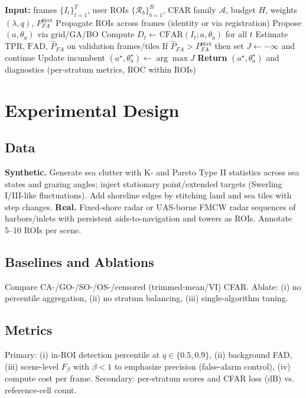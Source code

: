 \documentclass[conf]{new-aiaa}
\begin{document}
\begin{algorithm}[t]
\caption{User-in-the-Loop CFAR Tuning (High Level)}
\label{alg:cfar}
\begin{algorithmic}[1]
\STATE \textbf{Input:} frames $\{I_t\}_{t=1}^T$, user ROIs $\{\mathcal{R}_b\}_{b=1}^B$, CFAR family $\mathcal{A}$, budget $H$, weights $(\lambda, q)$, $P_{FA}^{\max}$
\STATE Propagate ROIs across frames (identity or via registration)
    \STATE Propose $(a,\theta_a)$ via grid/GA/BO
    \STATE Compute $D_t\leftarrow \mathrm{CFAR}(I_t; a,\theta_a)$ for all $t$
    \STATE Estimate $\mathrm{TPR}$, $\mathrm{FAD}$, $\widehat{P}_{FA}$ on validation frames/tiles
    \STATE If $\widehat{P}_{FA}>P_{FA}^{\max}$ then set $J\leftarrow -\infty$ and continue
    \STATE Update incumbent $(a^\star,\theta_a^\star)\leftarrow \arg\max J$
\ENDFOR
\STATE \textbf{Return} $(a^\star,\theta_a^\star)$ and diagnostics (per-stratum metrics, ROC within ROIs)
\end{algorithmic}
\end{algorithm}

\section{Experimental Design}
\subsection{Data}
\textbf{Synthetic.} Generate sea clutter with K- and Pareto Type II statistics across sea states and grazing angles; inject stationary point/extended targets (Swerling I/III-like fluctuations). Add shoreline edges by stitching land and sea tiles with step changes.\newline
\textbf{Real.} Fixed-shore radar or UAS-borne FMCW radar sequences of harbors/inlets with persistent aids-to-navigation and towers as ROIs. Annotate 5--10 ROIs per scene.

\subsection{Baselines and Ablations}
Compare CA-/GO-/SO-/OS-/censored (trimmed-mean/VI) CFAR. Ablate: (i) no percentile aggregation, (ii) no stratum balancing, (iii) single-algorithm tuning.

\subsection{Metrics}
Primary: (i) in-ROI detection percentile at $q\in\{0.5,0.9\}$, (ii) background FAD, (iii) scene-level $F_\beta$ with $\beta<1$ to emphasize precision (false-alarm control), (iv) compute cost per frame. Secondary: per-stratum scores and CFAR loss (dB) vs. reference-cell count.
\end{document}
